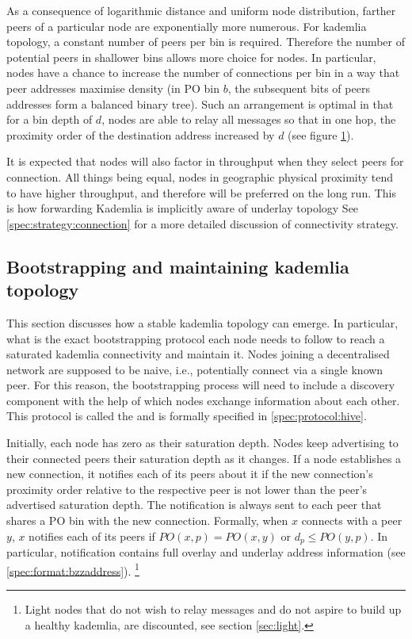 As a consequence of logarithmic distance and uniform node distribution, farther peers of a particular node are exponentially more numerous. For kademlia topology, a constant number of peers per bin is required. Therefore the number of potential peers in shallower bins allows more choice for nodes. In particular, nodes have a chance to increase the number of connections per bin in a way that peer addresses maximise density (in PO bin $b$, the subsequent bits of peers addresses form a balanced binary tree). Such an arrangement is optimal in that for a bin depth of $d$, nodes  are able to relay all messages so that in one hop, the proximity  order of the destination address increased by  $d$ (see figure \ref{fig:bindensity}). 


\begin{figure}[htbp]
   \centering
   \caption{}
   \label{fig:bindensity}
\end{figure}


It is expected that nodes will also factor in throughput when they select peers for connection. All things being equal, nodes in geographic physical proximity tend to have higher throughput, and therefore will be preferred on the long run. This is how forwarding Kademlia is implicitly aware of underlay topology \cite{heep2010r}See \ref{spec:strategy:connection} for a more detailed discussion of connectivity strategy.


\subsection{Bootstrapping and maintaining kademlia topology}\label{sec:bootstrapping}
 

This  section discusses how a stable kademlia topology  can emerge. In particular, what is the exact bootstrapping protocol each node needs to follow to reach a saturated kademlia connectivity and maintain it. Nodes joining a decentralised network  are supposed to be  naive, i.e., potentially connect via a single known peer. For this reason, the bootstrapping process  will need to include a discovery component with the help of which nodes exchange information about each other.  This protocol is called the  and is formally specified in \ref{spec:protocol:hive}.

Initially, each node has zero as their saturation depth. Nodes keep advertising to their connected peers their saturation depth as it changes. If a node establishes a new connection, it notifies each of its peers about it if the new connection's proximity order relative to the respective peer is not lower than the peer's advertised saturation depth. The notification is always sent to each peer that shares a PO bin with the new connection.  Formally, when $x$ connects with a peer $y$, $x$ notifies each of its peers if $\mathit{PO}(x, p) = \mathit{PO}(x, y)$ or $d_p\leq \mathit{PO}(y, p)$. In particular, notification contains  full overlay and underlay address information (see \ref{spec:format:bzzaddress}).%
%
\footnote{Light nodes that do not wish to relay messages and do not aspire to build up a healthy  kademlia, are discounted, see section \ref{sec:light}. }

